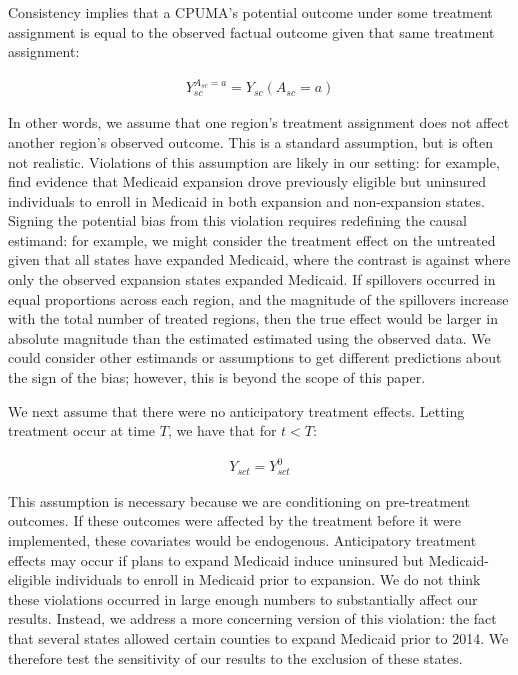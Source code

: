 \documentclass[aoas]{imsart}
\theoremstyle{plain}
\theoremstyle{remark}
\begin{document}
Consistency implies that a CPUMA's potential outcome under some treatment assignment is equal to the observed factual outcome given that same treatment assignment: 

\begin{align*}
Y_{sc}^{A_{sc} = a} = Y_{sc}(A_{sc} = a)
\end{align*}

In other words, we assume that one region's treatment assignment does not affect another region's observed outcome. This is a standard assumption, but is often not realistic. Violations of this assumption are likely in our setting: for example, \cite{frean2017premium} find evidence that Medicaid expansion drove previously eligible but uninsured individuals to enroll in Medicaid in both expansion and non-expansion states. Signing the potential bias from this violation requires redefining the causal estimand: for example, we might consider the treatment effect on the untreated given that all states have expanded Medicaid, where the contrast is against where only the observed expansion states expanded Medicaid. If spillovers occurred in equal proportions across each region, and the magnitude of the spillovers increase with the total number of treated regions, then the true effect would be larger in absolute magnitude than the estimated estimated using the observed data. We could consider other estimands or assumptions to get different predictions about the sign of the bias; however, this is beyond the scope of this paper.

We next assume that there were no anticipatory treatment effects. Letting treatment occur at time $T$, we have that for $t < T$:

\begin{align*}
Y_{sct} = Y_{sct}^0
\end{align*}

This assumption is necessary because we are conditioning on pre-treatment outcomes. If these outcomes were affected by the treatment before it were implemented, these covariates would be endogenous. Anticipatory treatment effects may occur if plans to expand Medicaid induce uninsured but Medicaid-eligible individuals to enroll in Medicaid prior to expansion. We do not think these violations occurred in large enough numbers to substantially affect our results. Instead, we address a more concerning version of this violation: the fact that several states allowed certain counties to expand Medicaid prior to 2014. We therefore test the sensitivity of our results to the exclusion of these states.
\end{document}
